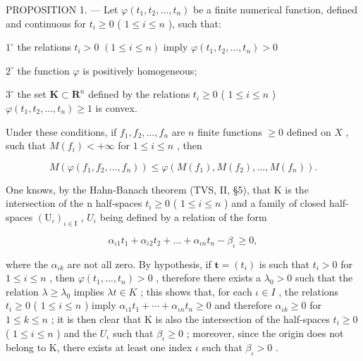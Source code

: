 PROPOSITION 1. --- Let \(\varphi(t_{1}, t_{2}, \ldots, t_{n})\) be a finite numerical function, defined and continuous for \(t_{i} \geqslant 0\) ( \(1 \leqslant i \leqslant n\) ), such that:

\(1^{\circ}\) the relations \(t_i > 0\) \((1\leqslant i\leqslant n)\) imply \(\varphi (t_1,t_2,\dots ,t_n) > 0\)

\(2^{\circ}\) the function \(\varphi\) is positively homogeneous;

\(3^{\circ}\) the set \(\mathbf{K} \subset \mathbf{R}^{n}\) defined by the relations \(t_{i} \geqslant 0\) ( \(1 \leqslant i \leqslant n\) ) \(\varphi(t_{1}, t_{2}, \ldots, t_{n}) \geqslant 1\) is convex.

Under these conditions, if \(f_1, f_2, \ldots, f_n\) are \(n\) finite functions \(\geqslant 0\) defined on \(X\) , such that \(M(f_i) < +\infty\) for \(1 \leqslant i \leqslant n\) , then

\[
M \left(\varphi \left(f _ {1}, f _ {2}, \dots , f _ {n}\right)\right) \leqslant \varphi \left(M \left(f _ {1}\right), M \left(f _ {2}\right), \dots , M \left(f _ {n}\right)\right).\tag{1}
\]

One knows, by the Hahn-Banach theorem (TVS, II, §5), that K is the intersection of the n half-spaces \(t_{i} \geqslant 0\) ( \(1 \leqslant i \leqslant n\) ) and a family of closed half-spaces \((\mathrm{U}_{\iota})_{\iota \in \mathrm{I}}\) , \(U_{\iota}\) being defined by a relation of the form

\[
\alpha_ {\iota 1} t _ {1} + \alpha_ {\iota 2} t _ {2} + \dots + \alpha_ {\iota n} t _ {n} - \beta_ {\iota} \geqslant 0,\tag{2}
\]

where the \(\alpha_{\iota k}\) are not all zero. By hypothesis, if \(\mathbf{t}=(t_{i})\) is such that \(t_{i}>0\) for \(1\leqslant i\leqslant n\) , then \(\varphi(t_{1},\ldots,t_{n})>0\) , therefore there exists a \(\lambda_{0}>0\) such that the relation \(\lambda\geqslant\lambda_{0}\) implies \(\lambda t\in K\) ; this shows that, for each \(\iota\in I\) , the relations \(t_{i}\geqslant0\) ( \(1\leqslant i\leqslant n\) ) imply \(\alpha_{\iota1}t_{1}+\cdots+\alpha_{\iota n}t_{n}\geqslant0\) and therefore \(\alpha_{\iota k}\geqslant0\) for \(1\leqslant k\leqslant n\) ; it is then clear that K is also the intersection of the half-spaces \(t_{i}\geqslant0\) ( \(1\leqslant i\leqslant n\) ) and the \(U_{\iota}\) such that \(\beta_{\iota}\geqslant0\) ; moreover, since the origin does not belong to K, there exists at least one index \(\iota\) such that \(\beta_{\iota}>0\) .

